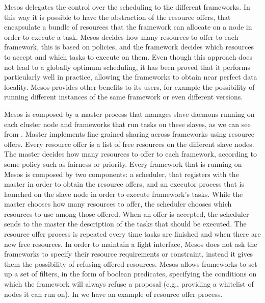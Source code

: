 Mesos delegates the control over the scheduling to the different frameworks. In this way it is possible to have the abstraction of the resource offers, that encapsulate a bundle of resources that the framework can allocate on a node in order to execute a task. Mesos decides how many resources to offer to each framework, this is based on policies, and the framework decides which resources to accept and which tasks to execute on them. Even though this approach does not
lead to a globally optimum scheduling, it has been proved that it performs particularly well in practice, allowing the frameworks to obtain near perfect data locality. Mesos provides other benefits to its users, for example the possibility of running different instances of the same
framework or even different versions.

Mesos is composed by a master process that manages slave daemons running on each cluster node and frameworks that run tasks on these slaves, as we can see from  . Master implements fine-grained sharing across frameworks using resource offers. Every resource offer is a list of free resources on the different slave nodes. The master decides how many resources to offer to each framework, according to some policy such as fairness or priority. Every framework that is running on Mesos is composed by two components: a scheduler, that registers with the master in order to obtain the resource
offers, and an executor process that is launched on the slave node in order to execute framework’s tasks. While the master chooses how many resources to offer, the scheduler chooses which resources to use among those offered. When an offer is accepted, the scheduler sends to the master the description of the tasks that should be executed. The resource offer process is repeated every time tasks are finished and when there are new free resources. In order to maintain a light interface, Mesos does not ask the frameworks to specify their resource requirements or constraint, instead it gives them the possibility of refusing offered resources. Mesos allows frameworks to set up a set of filters, in the form of boolean predicates, specifying the conditions on which the framework will always refuse a proposal
(e.g., providing a whitelist of nodes it can run on). In   we have an example of resource offer process.

